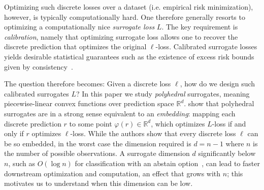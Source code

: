 \documentclass[final]{colt2020} %
\newcommand{\reals}{\mathbb{R}}
\begin{document}
Optimizing such discrete losses over a dataset (i.e. empirical risk minimization), however, is typically computationally hard.
One therefore generally resorts to optimizing a computationally nice \emph{surrogate loss} $L$.
The key requirement is \emph{calibration}, namely that optimizing surrogate loss allows one to recover the discrete prediction that optimizes the original $\ell$-loss.
Calibrated surrogate losses yields desirable statistical guarantees such as the existence of excess risk bounds given by consistency~\citep{tewari2007consistency}.

The question therefore becomes: Given a discrete loss $\ell$, how do we design such calibrated surrogates $L$? 
In this paper we study \emph{polyhedral} surrogates, meaning piecewise-linear convex functions over prediction space $\reals^d$.
\citet{finocchiaro2019embedding} show that polyhedral surrogates are in a strong sense equivalent to an \emph{embedding}: %
mapping each discrete prediction $r$ to some point $\varphi(r) \in \reals^d$, which optimizes $L$-loss if and only if $r$ optimizes $\ell$-loss.
While the authors show that every discrete loss $\ell$ can be so embedded, in the worst case the dimension required is $d=n-1$ where $n$ is the number of possible observations.
A surrogate dimension $d$ significantly below $n$, such as $O(\log n)$ for classification with an abstain option~\citep{ramaswamy2018consistent}, can lead to faster downstream optimization and computation, an effect that grows with $n$; this motivates us to understand when this dimension can be low.
\end{document}
